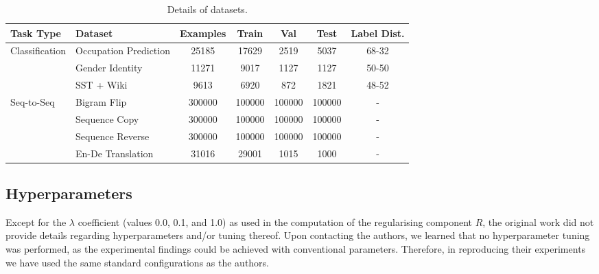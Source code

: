 \begin{table}
  \caption{Details of datasets.}
  \label{tab:dataset-table}
  \centering
\begin{tabular}{llccccc}
\toprule
 Task Type               &    Dataset                   & Examples & Train & Val  & Test & Label Dist.\\ \midrule
Classification & Occupation Prediction &     25185       & 17629         & 2519      & 5037       & 68-32 \\
               & Gender Identity       &    11271       & 9017          & 1127      & 1127       & 50-50   \\
               & SST + Wiki            &    9613        & 6920          & 872       & 1821       & 48-52   \\ \midrule
Seq-to-Seq     & Bigram Flip           &    300000      &   100000      &  100000   & 100000  &   -       \\
               & Sequence Copy         &    300000      &   100000      &   100000  & 100000  &   -     \\
               & Sequence Reverse      &    300000      &   100000      &  100000   & 100000  &    -    \\
               & En-De Translation     &    31016       &    29001      &  1015     & 1000    &    -    \\
               \bottomrule
  \end{tabular}
\end{table}

\subsection{Hyperparameters}

Except for the $\lambda$ coefficient (values 0.0, 0.1, and 1.0) as used in the computation of the regularising component $R$, the original work did not provide details regarding hyperparameters and/or tuning thereof. Upon contacting the authors, we learned that no hyperparameter tuning was performed, as the experimental findings could be achieved with conventional parameters. Therefore, in reproducing their experiments we have used the same standard configurations as the authors. %


